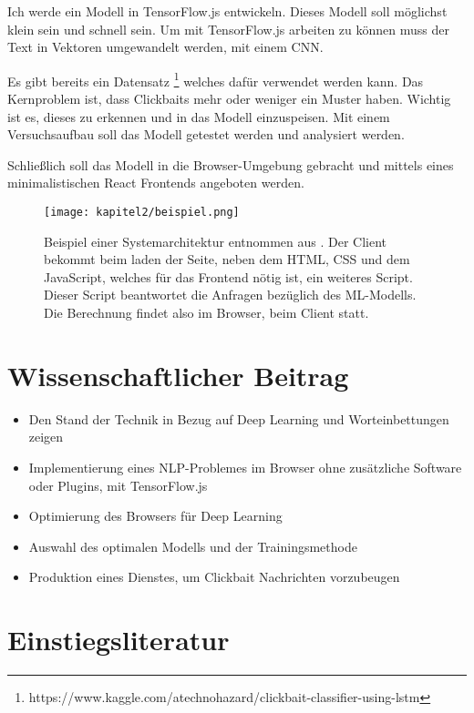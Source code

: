 Ich werde ein Modell in TensorFlow.js entwickeln. Dieses Modell soll möglichst klein sein und schnell sein. Um mit TensorFlow.js arbeiten zu können muss der Text in Vektoren umgewandelt werden, \zb mit einem CNN.

Es gibt bereits ein Datensatz \footnote{https://www.kaggle.com/atechnohazard/clickbait-classifier-using-lstm} welches dafür verwendet werden kann. Das Kernproblem ist, dass Clickbaits mehr oder weniger ein Muster haben. Wichtig ist es, dieses zu erkennen und in das Modell einzuspeisen. Mit einem Versuchsaufbau soll das Modell getestet werden und analysiert werden. 

Schließlich soll das Modell in die Browser-Umgebung gebracht und mittels eines minimalistischen React Frontends angeboten werden.

\begin{figure}[ht]
  \centering
  \texttt{[image: kapitel2/beispiel.png]}
  \caption[Beispiel einer Systemarchitektur]{Beispiel einer Systemarchitektur entnommen aus \cite{cho2019shop}. Der Client bekommt beim laden der Seite, neben dem HTML, CSS und dem JavaScript, welches für das Frontend nötig ist, ein weiteres Script. Dieser Script beantwortet die Anfragen bezüglich des ML-Modells. Die Berechnung findet also im Browser, beim Client statt.}
  \label{Kap2:SystemArchitektur}
\end{figure}
 
\section{Wissenschaftlicher Beitrag}
\begin{itemize}
  \item Den Stand der Technik in Bezug auf Deep Learning und Worteinbettungen zeigen
  \item Implementierung eines NLP-Problemes im Browser ohne zusätzliche Software oder Plugins, mit TensorFlow.js
  \item Optimierung des Browsers für Deep Learning 
  \item Auswahl des optimalen Modells und der Trainingsmethode
  \item Produktion eines Dienstes, um Clickbait Nachrichten vorzubeugen
\end{itemize}

\section{Einstiegsliteratur}

